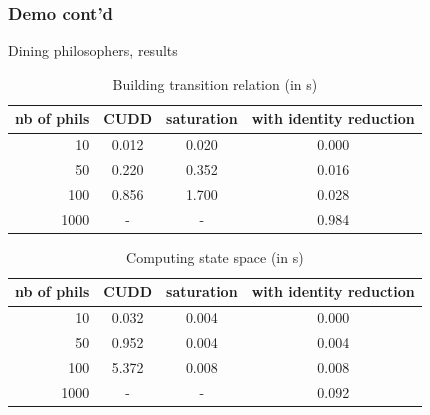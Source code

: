 \documentclass{beamer}
\begin{document}
\begin{frame}
  \frametitle{Demo cont'd}
  Dining philosophers, results
  \begin{table}
    \begin{tabular}{r|ccc}
      nb of phils & CUDD & saturation & with identity reduction \\
      \hline
      10 & 0.012 & 0.020 & 0.000 \\
      50 & 0.220 & 0.352 & 0.016 \\
      100 & 0.856 & 1.700 & 0.028 \\
      1000 & - & - & 0.984
    \end{tabular}
    \caption{Building transition relation (in s)}
  \end{table}

  \begin{table}
    \begin{tabular}{r|ccc}
      nb of phils & CUDD & saturation & with identity reduction \\
      \hline
      10 & 0.032 & 0.004 & 0.000 \\
      50 & 0.952 & 0.004 & 0.004 \\
      100 & 5.372 & 0.008 & 0.008 \\
      1000 & - & - & 0.092
    \end{tabular}
    \caption{Computing state space (in s)}
  \end{table}
\end{frame}
\end{document}
